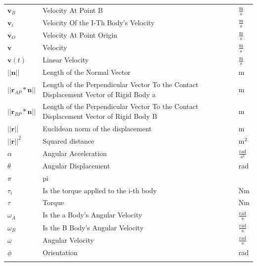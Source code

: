 \documentclass[12pt]{article}
\begin{document}
\begin{longtabu}{l X[l] l}
${\mathbf{v}_{B}}$ & Velocity At Point B & $\frac{\text{m}}{\text{s}}$
\\
${\mathbf{v}_{i}}$ & Velocity Of the I-Th Body's Velocity & $\frac{\text{m}}{\text{s}}$
\\
${\mathbf{v}_{O}}$ & Velocity At Point Origin & $\frac{\text{m}}{\text{s}}$
\\
$\mathbf{v}$ & Velocity & $\frac{\text{m}}{\text{s}}$
\\
$\mathbf{v}(t)$ & Linear Velocity & $\frac{\text{m}}{\text{s}}$
\\
$||\mathbf{n}||$ & Length of the Normal Vector & m
\\
$||{\mathbf{r}_{AP}}*\mathbf{n}||$ & Length of the Perpendicular Vector To the Contact Displacement Vector of Rigid Body a & m
\\
$||{\mathbf{r}_{BP}}*\mathbf{n}||$ & Length of the Perpendicular Vector To the Contact Displacement Vector of Rigid Body B & m
\\
$||\mathbf{r}||$ & Euclidean norm of the displacement & m
\\
${||\mathbf{r}||^{2}}$ & Squared distance & $\text{m}^{2}$
\\
$α$ & Angular Acceleration & $\frac{\text{rad}}{\text{s}^{2}}$
\\
$θ$ & Angular Displacement & rad
\\
$π$ & pi & 
\\
${τ_{i}}$ & Is the torque applied to the i-th body & Nm
\\
$τ$ & Torque & Nm
\\
${ω_{A}}$ & Is the a Body's Angular Velocity & $\frac{\text{rad}}{\text{s}}$
\\
${ω_{B}}$ & Is the B Body's Angular Velocity & $\frac{\text{rad}}{\text{s}}$
\\
$ω$ & Angular Velocity & $\frac{\text{rad}}{\text{s}}$
\\
$ϕ$ & Orientation & rad
\\
\bottomrule
\label{Table:ToS}
\end{longtabu}
\end{document}
